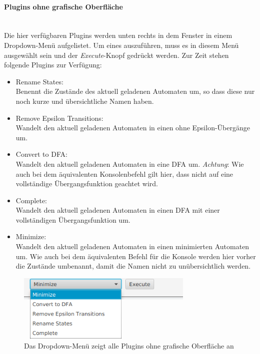 \paragraph{Plugins ohne grafische Oberfläche}\ \\
\label{sec:2.4.2.2}
Die hier verfügbaren Plugins werden unten rechts in dem Fenster in einem Dropdown-Menü aufgelistet. Um eines auszuführen, muss es in diesem Menü ausgewählt sein und der \textit{Execute}-Knopf gedrückt werden. Zur Zeit stehen folgende Plugins zur Verfügung:
\begin{itemize}
	\item Rename States:\\
	Benennt die Zustände des aktuell geladenen Automaten um, so dass diese nur noch kurze und übersichtliche Namen haben.
	\item Remove Epsilon Transitions:\\
	Wandelt den aktuell geladenen Automaten in einen ohne Epsilon-Übergänge um.
	\item Convert to DFA:\\
	Wandelt den aktuell geladenen Automaten in eine DFA um. \textit{Achtung}: Wie auch bei dem äquivalenten Konsolenbefehl gilt hier, dass nicht auf eine vollständige Übergangsfunktion geachtet wird.
	\item Complete:\\
	Wandelt den aktuell geladenen Automaten in einen DFA mit einer vollständigen Übergangsfunktion um.
	\item Minimize:\\
	Wandelt den aktuell geladenen Automaten in einen minimierten Automaten um. Wie auch bei dem äquivalenten Befehl für die Konsole werden hier vorher die Zustände umbenannt, damit die Namen nicht zu unübersichtlich werden.
\end{itemize}
\begin{figure}[H]
	\centering
	\includegraphics[width=0.75\textwidth]{bilder/gui4.png}
	\caption{Das Dropdown-Menü zeigt alle Plugins ohne grafische Oberfläche an}
	\label{fig:pic7}
\end{figure}